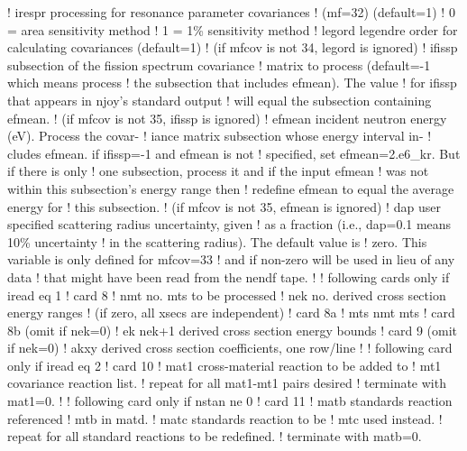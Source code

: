 \begin{ccode}
   !    irespr  processing for resonance parameter covariances
   !            (mf=32) (default=1)
   !            0 = area sensitivity method
   !            1 = 1\% sensitivity method
   !    legord  legendre order for calculating covariances (default=1)
   !            (if mfcov is not 34, legord is ignored)
   !    ifissp  subsection of the fission spectrum covariance
   !            matrix to process (default=-1 which means process
   !            the subsection that includes efmean).  The value
   !            for ifissp that appears in njoy's standard output
   !            will equal the subsection containing efmean.
   !            (if mfcov is not 35, ifissp is ignored)
   !    efmean  incident neutron energy (eV).  Process the covar-
   !            iance matrix subsection whose energy interval in-
   !            cludes efmean.  if ifissp=-1 and efmean is not
   !            specified, set efmean=2.e6_kr.  But if there is only
   !            one subsection, process it and if the input efmean
   !            was not within this subsection's energy range then
   !            redefine efmean to equal the average energy for
   !            this subsection.
   !            (if mfcov is not 35, efmean is ignored)
   !    dap     user specified scattering radius uncertainty, given
   !            as a fraction (i.e., dap=0.1 means 10\% uncertainty
   !            in the scattering radius).  The default value is
   !            zero.  This variable is only defined for mfcov=33
   !            and if non-zero will be used in lieu of any data
   !            that might have been read from the nendf tape.
   !
   !  following cards only if iread eq 1
   !  card 8
   !    nmt     no. mts to be processed
   !    nek     no. derived cross section energy ranges
   !            (if zero, all xsecs are independent)
   !  card 8a
   !    mts     nmt mts
   !  card 8b   (omit if nek=0)
   !    ek      nek+1 derived cross section energy bounds
   !  card 9    (omit if nek=0)
   !    akxy    derived cross section coefficients, one row/line
   !
   !  following card only if iread eq 2
   !  card 10
   !    mat1    cross-material reaction to be added to
   !    mt1         covariance reaction list.
   !            repeat for all mat1-mt1 pairs desired
   !            terminate with mat1=0.
   !
   !  following card only if nstan ne 0
   !  card 11
   !    matb    standards reaction referenced
   !    mtb         in matd.
   !    matc    standards reaction to be
   !    mtc         used instead.
   !            repeat for all standard reactions to be redefined.
   !            terminate with matb=0.

\end{ccode}
